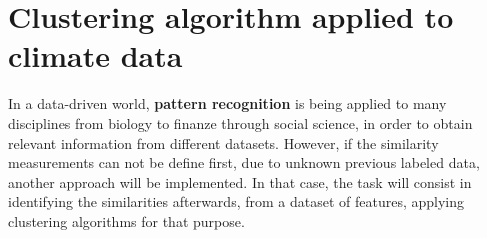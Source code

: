   
\section{Clustering algorithm applied to climate data}




In a data-driven world, \textbf{pattern recognition} is being applied to many disciplines from biology to finanze through social science, in order to obtain relevant information from different datasets.
However, if the similarity measurements can not be define first, due to unknown previous labeled data, another approach will be implemented. In that case, the task will consist in identifying the similarities afterwards, from a dataset of features, applying clustering algorithms for that purpose.

